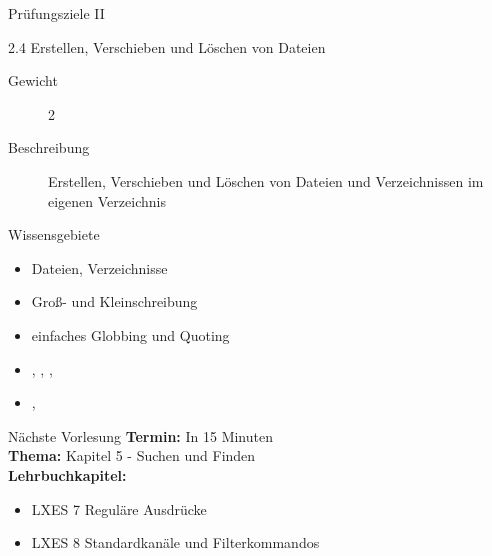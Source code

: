 \documentclass[aspectratio=43]{beamer}
\begin{document}
\begin{frame}{Prüfungsziele II}
  \begin{alertblock}{2.4 Erstellen, Verschieben und Löschen von Dateien}
    \begin{description}
      \item[Gewicht]  2
      \item[Beschreibung] Erstellen, Verschieben und Löschen von Dateien und Verzeichnissen im eigenen Verzeichnis
    \end{description}
       Wissensgebiete\\ 
        \begin{itemize}
          \item Dateien, Verzeichnisse
          \item Groß- und Kleinschreibung
          \item einfaches Globbing und Quoting
          \item {}, , , 
          \item {}, 
        \end{itemize}
  \end{alertblock}
\end{frame}
\begin{frame}[plain]
  \begin{alertblock}{Nächste Vorlesung}
    \textbf{Termin:} In 15 Minuten\\
    \textbf{Thema:} Kapitel 5 - Suchen und Finden \\
    \textbf{Lehrbuchkapitel:} 
    \begin{itemize}
      \item LXES 7 Reguläre Ausdrücke
      \item LXES 8 Standardkanäle und Filterkommandos
    \end{itemize}
  \end{alertblock}
\end{frame}

\materialframe
\end{document}
